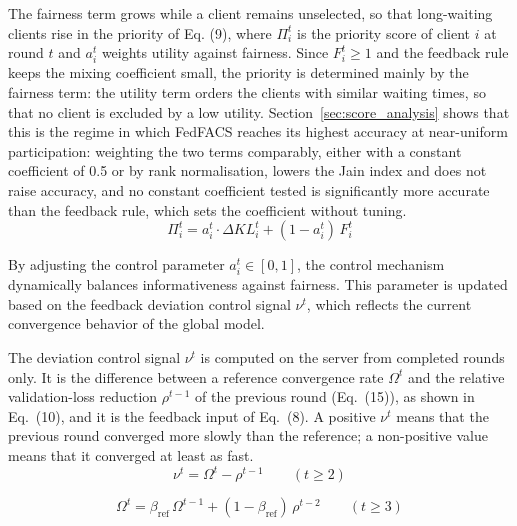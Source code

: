 \documentclass[pdflatex,sn-mathphys-num,oneside]{sn-jnl}%
\theoremstyle{thmstyleone}%
\theoremstyle{thmstyletwo}%
\theoremstyle{thmstylethree}%
\begin{document}
The fairness term grows while a client remains unselected, so that long-waiting clients rise in the priority of Eq. (9), where $\Pi_i^t$ is the priority score of client $i$ at round $t$ and $a_i^t$ weights utility against fairness. Since $F_i^t \ge 1$ and the feedback rule keeps the mixing coefficient small, the priority is determined mainly by the fairness term: the utility term orders the clients with similar waiting times, so that no client is excluded by a low utility. Section~\ref{sec:score_analysis} shows that this is the regime in which FedFACS reaches its highest accuracy at near-uniform participation: weighting the two terms comparably, either with a constant coefficient of 0.5 or by rank normalisation, lowers the Jain index and does not raise accuracy, and no constant coefficient tested is significantly more accurate than the feedback rule, which sets the coefficient without tuning.
\begin{equation}
\Pi_i^t = a_i^t \cdot \Delta KL_i^t + (1 - a_i^t)\, F_i^t
\label{eq:priority}
\end{equation}

By adjusting the control parameter $a_i^t \in [0,1]$, the control mechanism dynamically balances informativeness against fairness. This parameter is updated based on the feedback deviation control signal $\nu^t$, which reflects the current convergence behavior of the global model.

The deviation control signal $\nu^t$ is computed on the server from completed rounds only. It is the difference between a reference convergence rate $\Omega^t$ and the relative validation-loss reduction $\rho^{t-1}$ of the previous round (Eq.~(15)), as shown in Eq.~(10), and it is the feedback input of Eq.~(8). A positive $\nu^t$ means that the previous round converged more slowly than the reference; a non-positive value means that it converged at least as fast.
\begin{equation}
\nu^t = \Omega^t - \rho^{t-1}\qquad (t \ge 2)
\label{eq:deviation}
\end{equation}

\begin{equation}
\Omega^t = \beta_{\text{ref}}\,\Omega^{t-1} + (1-\beta_{\text{ref}})\,\rho^{t-2}\qquad (t \ge 3)
\label{eq:reference_rate}
\end{equation}
\end{document}

